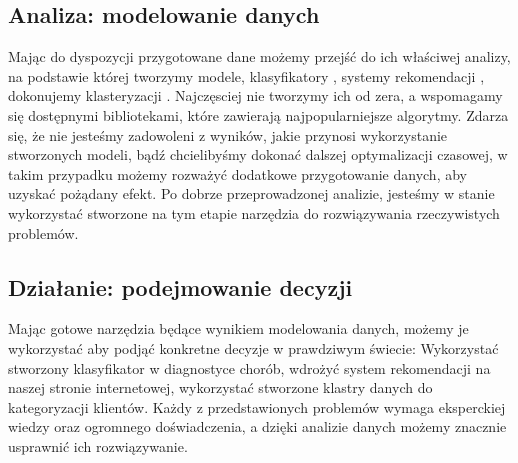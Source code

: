 \documentclass{book}
\begin{document}
\subsection*{Analiza: modelowanie danych}
Mając do dyspozycji przygotowane dane możemy przejść do ich właściwej analizy, 
na podstawie której tworzymy modele, klasyfikatory \cite{classifiers}, systemy rekomendacji 
\cite{recomendation_systems}, dokonujemy klasteryzacji \cite{clustering}. 
Najczęsciej nie tworzymy ich od zera, a wspomagamy się dostępnymi bibliotekami, które zawierają 
najpopularniejsze algorytmy. Zdarza się, że nie jesteśmy zadowoleni z wyników, jakie przynosi 
wykorzystanie stworzonych modeli, bądź chcielibyśmy dokonać dalszej optymalizacji czasowej, 
w takim przypadku możemy rozważyć dodatkowe przygotowanie danych, aby uzyskać pożądany efekt.
Po dobrze przeprowadzonej analizie, jesteśmy w stanie 
wykorzystać stworzone na tym etapie narzędzia do rozwiązywania rzeczywistych problemów.

\subsection*{Działanie: podejmowanie decyzji}
Mając gotowe narzędzia będące wynikiem modelowania danych, możemy je wykorzystać aby podjąć 
konkretne decyzje w prawdziwym świecie: Wykorzystać stworzony 
klasyfikator w diagnostyce chorób, wdrożyć system rekomendacji 
na naszej stronie internetowej, wykorzystać stworzone klastry danych do kategoryzacji klientów. 
Każdy z przedstawionych problemów wymaga eksperckiej wiedzy oraz ogromnego doświadczenia, 
a dzięki analizie danych możemy znacznie usprawnić ich rozwiązywanie.
\end{document}
